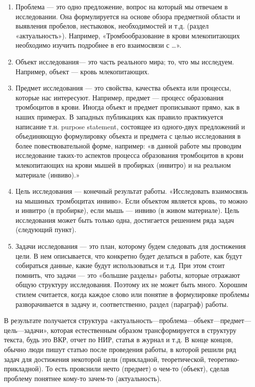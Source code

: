 \documentclass{report}
\begin{document}
\begin{enumerate}
	\item Проблема — это одно предложение, вопрос на который мы отвечаем в исследовании. Она формулируется на основе обзора предметной области и выявления пробелов, нестыковок, необходимостей и т.д. (раздел «актуальность»). Например, «Тромбообразование в крови млекопитающих необходимо изучить подробнее в его взаимосвязи с …».
	\item Объект исследования— это часть реального мира; то, что мы исследуем. Например, объект — кровь млекопитающих.
	\item Предмет исследования — это свойства, качества объекта или процессы, которые нас интересуют. Например, предмет — процесс образования тромбоцитов в крови. Иногда объект и предмет прописывают прямо, как в наших примерах. В западных публикациях как правило практикуется написание т.н. purpose statement, состоящее из одного-двух предложений и объединяющую формулировку объекта и предмета с целью исследования в более повествовательной форме, например: «в данной работе мы проводим исследование таких-то аспектов процесса образования тромбоцитов в крови млекопитающих на крови мышей в пробирках (инвитро) и на реальном материале (инвиво).»
	\item Цель исследования — конечный результат работы. «Исследовать взаимосвязь на мышиных тромбоцитах инвиво». Если объектом является кровь, то можно и инвитро (в пробирке), если мышь — инвиво (в живом материале). Цель исследования может быть только одна, достигается решением ряда задач (следующий пункт).
	\item Задачи исследования — это план, которому будем следовать для достижения цели. В нем описывается, что конкретно будет делаться в работе, как будут собираться данные, какие будут использоваться и т.д. При этом стоит помнить, что задачи — это «большие разделы» работы, которые отражают общую структуру исследования. Поэтому их не может быть много. Хорошим стилем считается, когда каждое слово или понятие в формулировке проблемы разворачивается в задачу и, соответственно, раздел (параграф) работы.
\end{enumerate}



В результате получается структура
«актуальность—проблема—объект—предмет—цель—задачи», которая естественным образом трансформируется в структуру текста, будь это ВКР, отчет по НИР, статья в журнал и т.д. В конце концов, обычно люди пишут статью после проведения работы, в которой решили ряд задач для достижения некоторой цели (прикладной, теоретической, теоретико-прикладной). То есть прояснили нечто (предмет) о чем-то (объект), сделав проблему понятнее кому-то зачем-то (актуальность).
\end{document}

